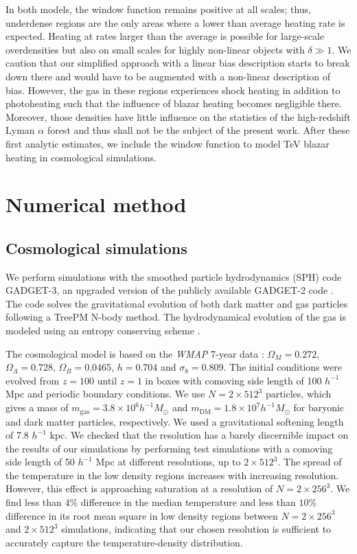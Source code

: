 \documentclass[numberedappendix]{emulateapj}
\begin{document}
In both models, the window function remains positive at all scales; thus, underdense regions are the only areas where a lower than average heating rate is expected. Heating at rates larger than the average is possible for large-scale overdensities but also on small scales for highly non-linear objects with $\delta\gg1$. We caution that our simplified approach with a linear bias description starts to break down there and would have to be augmented with a non-linear description of bias. However, the gas in these regions experiences shock heating in addition to photoheating such that the influence of blazar heating becomes negligible there. Moreover, those densities have little influence on the statistics of the high-redshift Lyman $\alpha$ forest and thus shall not be the subject of the present work. After these first analytic estimates, we include the window function to model TeV blazar heating in cosmological simulations.

\section{Numerical method}
\subsection{Cosmological simulations}
We perform simulations with the smoothed particle hydrodynamics (SPH) code \textsc{GADGET-3}, an upgraded version of the publicly available \textsc{GADGET-2} code \citep{2005MNRAS.364.1105S}. The code solves the gravitational evolution of both dark matter and gas particles following a TreePM N-body method. The hydrodynamical evolution of the gas is modeled using an entropy conserving scheme \citep{2002MNRAS.333..649S}.

The cosmological model is based on the \textit{WMAP} 7-year data \citep{2011ApJS..192...18K}: $\Omega_M=0.272$, $\Omega_{\Lambda}=0.728$, $\Omega_{B}= 0.0465$, $h=0.704$ and $\sigma_8=0.809$. The initial conditions were evolved from $z=100$ until $z=1$ in boxes with comoving side length of 100 $h^{-1}$ Mpc and periodic boundary conditions. We use $N= 2\times 512^3$ particles, which gives a mass of $m_\mathrm{gas}=3.8\times10^{6} h^{-1} M_{\odot}$ and $m_\mathrm{DM}=1.8\times 10^{7} h^{-1} M_{\odot}$ for baryonic and dark matter particles, respectively. We used a gravitational softening length of 7.8 $h^{-1}$ kpc. We checked that the resolution has a barely discernible impact on the results of our simulations by performing test simulations with a comoving side length of 50 $h^{-1}$ Mpc at different resolutions, up to $2\times 512^3$. The spread of the temperature in the low density regions increases with increasing resolution. However, this effect is approaching saturation at a resolution of $N=2\times 256^3$. We find less than $4\%$ difference in the median temperature and less than $10\%$ difference in its root mean square in low density regions between $N=2\times 256^3$ and $2\times 512^3$ simulations, indicating that our chosen resolution is sufficient to accurately capture the temperature-density distribution. 
\end{document}
